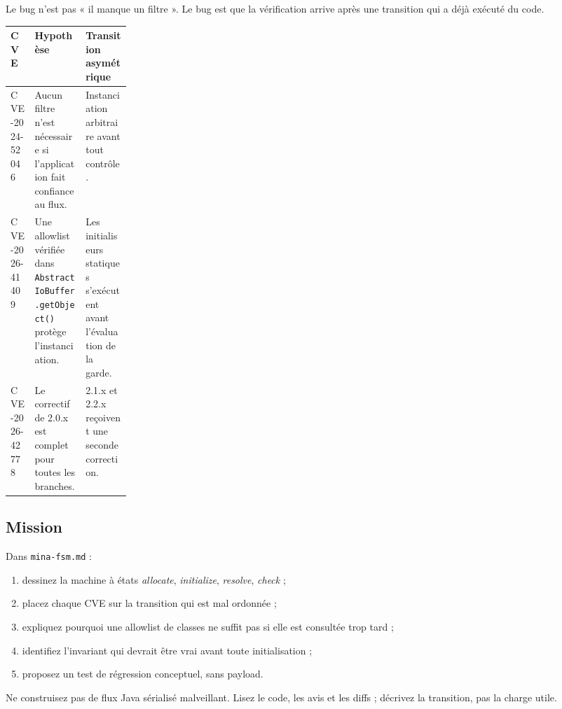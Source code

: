 \documentclass{training}
\begin{document}
Le bug n'est pas « il manque un filtre ». Le bug est que la vérification
arrive après une transition qui a déjà exécuté du code.

\begin{center}
\begin{tabularx}{\linewidth}{|p{0.2\linewidth}|X|X|}
\hline
\textbf{CVE} & \textbf{Hypothèse} & \textbf{Transition asymétrique} \\ \hline
CVE-2024-52046 & Aucun filtre n'est nécessaire si l'application fait
confiance au flux. & Instanciation arbitraire avant tout contrôle. \\ \hline
CVE-2026-41409 & Une allowlist vérifiée dans
\texttt{AbstractIoBuffer.getObject()} protège l'instanciation. & Les
initialiseurs statiques s'exécutent avant l'évaluation de la garde. \\ \hline
CVE-2026-42778 & Le correctif de 2.0.x est complet pour toutes les
branches. & 2.1.x et 2.2.x reçoivent une seconde correction. \\ \hline
\end{tabularx}
\end{center}

\subsection*{Mission}

Dans \texttt{mina-fsm.md} :

\begin{enumerate}
  \item dessinez la machine à états \emph{allocate}, \emph{initialize},
        \emph{resolve}, \emph{check} ;
  \item placez chaque CVE sur la transition qui est mal ordonnée ;
  \item expliquez pourquoi une allowlist de classes ne suffit pas si elle
        est consultée trop tard ;
  \item identifiez l'invariant qui devrait être vrai avant toute
        initialisation ;
  \item proposez un test de régression conceptuel, sans payload.
\end{enumerate}

\begin{warn}
Ne construisez pas de flux Java sérialisé malveillant. Lisez le code, les
avis et les diffs ; décrivez la transition, pas la charge utile.
\end{warn}
\end{document}
